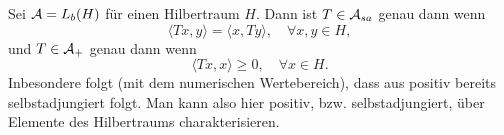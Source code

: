 \begin{example}
    Sei $\mathcal{A} = L_b(H)$ für einen Hilbertraum $H$. Dann ist $T \in \mathcal{A}_{sa}$ genau dann wenn
    $$ \langle Tx, y \rangle = \langle x, Ty \rangle, \quad \forall x, y \in H, $$
    und $T \in \mathcal{A}_+$ genau dann wenn
    $$ \langle Tx, x \rangle \geq 0, \quad \forall x \in H. $$
    Inbesondere folgt (mit dem numerischen Wertebereich), dass aus positiv bereits selbstadjungiert folgt. Man kann also hier positiv, bzw. selbstadjungiert, über Elemente des Hilbertraums charakterisieren.
\end{example}